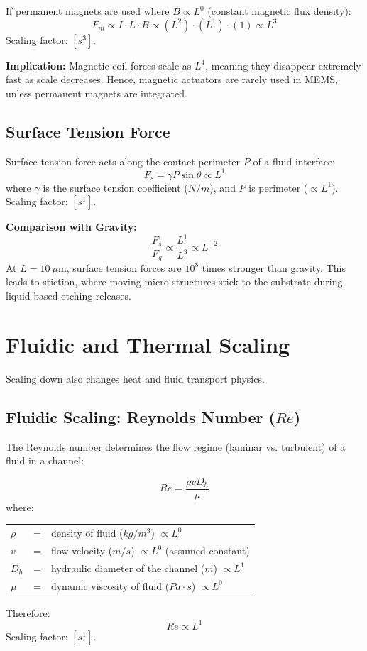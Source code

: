\documentclass[12pt,a4paper]{article}
\begin{document}
If permanent magnets are used where $B \propto L^0$ (constant magnetic flux density):
$$F_m \propto I \cdot L \cdot B \propto (L^2) \cdot (L^1) \cdot (1) \propto L^3$$
Scaling factor: $[s^3]$.

\textbf{Implication:} Magnetic coil forces scale as $L^4$, meaning they disappear extremely fast as scale decreases. Hence, magnetic actuators are rarely used in MEMS, unless permanent magnets are integrated.

\subsection{Surface Tension Force}
Surface tension force acts along the contact perimeter $P$ of a fluid interface:
$$F_s = \gamma P \sin\theta \propto L^1$$
where $\gamma$ is the surface tension coefficient ($N/m$), and $P$ is perimeter ($\propto L^1$).
Scaling factor: $[s^1]$.

\textbf{Comparison with Gravity:}
$$\frac{F_s}{F_g} \propto \frac{L^1}{L^3} \propto L^{-2}$$
At $L = 10\ \mu\text{m}$, surface tension forces are $10^8$ times stronger than gravity. This leads to stiction, where moving micro-structures stick to the substrate during liquid-based etching releases.

\section{Fluidic and Thermal Scaling}

Scaling down also changes heat and fluid transport physics.

\subsection{Fluidic Scaling: Reynolds Number \texorpdfstring{($Re$)}{Re}}
The Reynolds number determines the flow regime (laminar vs. turbulent) of a fluid in a channel:
\begin{tcolorbox}[formulabox, title={Reynolds Number Scaling}]
$$Re = \frac{\rho v D_h}{\mu}$$
where:
\begin{tabular}{lcl}
$\rho$ & = & density of fluid ($kg/m^3$) $\propto L^0$ \\
$v$ & = & flow velocity ($m/s$) $\propto L^0$ (assumed constant) \\
$D_h$ & = & hydraulic diameter of the channel ($m$) $\propto L^1$ \\
$\mu$ & = & dynamic viscosity of fluid ($Pa \cdot s$) $\propto L^0$
\end{tabular}
\end{tcolorbox}
Therefore:
$$Re \propto L^1$$
Scaling factor: $[s^1]$.
\end{document}
